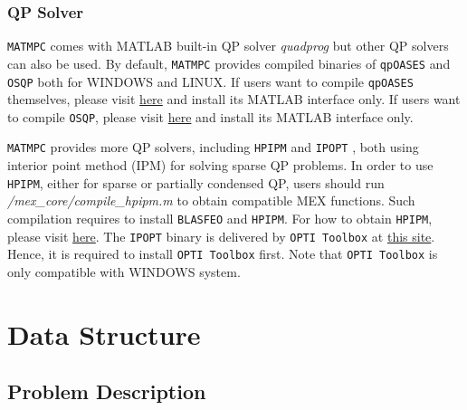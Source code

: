 \documentclass{article}
\newcommand{\software}[1]{{\tt#1}}
\begin{document}
\subsubsection{QP Solver}
\software{MATMPC} comes with MATLAB built-in QP solver \emph{quadprog} but other QP solvers can also be used. By default, \software{MATMPC} provides compiled binaries of \software{qpOASES} \cite{ferreau2014qpoases} and \software{OSQP} \cite{stellato2018osqp} both for WINDOWS and LINUX. If users want to compile \software{qpOASES} themselves, please visit \href{https://projects.coin-or.org/qpOASES/wiki/QpoasesInstallation}{here} and install its MATLAB interface only. If users want to compile \software{OSQP}, please visit \href{https://osqp.org/}{here} and install its MATLAB interface only.

\software{MATMPC} provides more QP solvers, including \software{HPIPM} and \software{IPOPT} \cite{wachter2006implementation}, both using interior point method (IPM) for solving sparse QP problems. In order to use \software{HPIPM}, either for sparse or partially condensed QP, users should run \emph{/mex\_core/compile\_hpipm.m} to obtain compatible MEX functions. Such compilation requires to install \software{BLASFEO} and \software{HPIPM}. For how to obtain \software{HPIPM}, please visit \href{https://github.com/giaf/hpipm}{here}. The \software{IPOPT} binary is delivered by \software{OPTI Toolbox} at \href{https://www.inverseproblem.co.nz/OPTI/}{this site}. Hence, it is required to install \software{OPTI Toolbox} first. Note that \software{OPTI Toolbox} is only compatible with WINDOWS system.

\section{Data Structure}

\subsection{Problem Description}
\end{document}
